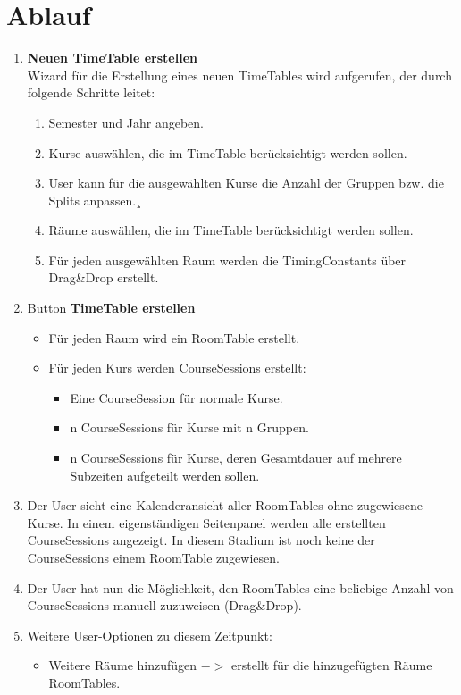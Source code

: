 \documentclass{article}
\begin{document}
	\section{Ablauf}
	\begin{enumerate}
		\item \textbf{Neuen TimeTable erstellen}\\
		Wizard für die Erstellung eines neuen TimeTables wird aufgerufen, der durch folgende Schritte leitet:
		\begin{enumerate}
			\item Semester und Jahr angeben.
			\item Kurse auswählen, die im TimeTable berücksichtigt werden sollen.
			\item User kann für die ausgewählten Kurse die Anzahl der Gruppen bzw. die Splits anpassen.¸
			\item Räume auswählen, die im TimeTable berücksichtigt werden sollen.
			\item Für jeden ausgewählten Raum werden die TimingConstants über Drag\&Drop erstellt.
		\end{enumerate}
		\item Button \textbf{TimeTable erstellen}
		\begin{itemize}
			\item Für jeden Raum wird ein RoomTable erstellt.
			\item Für jeden Kurs werden CourseSessions erstellt:
			\begin{itemize}
				\item Eine CourseSession für normale Kurse.
				\item n CourseSessions für Kurse mit n Gruppen.
				\item n CourseSessions für Kurse, deren Gesamtdauer auf mehrere Subzeiten aufgeteilt werden sollen. 
			\end{itemize}
		\end{itemize}
		\item Der User sieht eine Kalenderansicht aller RoomTables ohne zugewiesene Kurse. In einem eigenständigen Seitenpanel werden alle erstellten CourseSessions angezeigt. In diesem Stadium ist noch keine der CourseSessions einem RoomTable zugewiesen.
		\item Der User hat nun die Möglichkeit, den RoomTables eine beliebige Anzahl von CourseSessions manuell zuzuweisen (Drag\&Drop).
		\item Weitere User-Optionen zu diesem Zeitpunkt:
		\begin{itemize}
			\item Weitere Räume hinzufügen $->$ erstellt für die hinzugefügten Räume RoomTables.

\end{itemize}
\end{enumerate}
\end{document}
